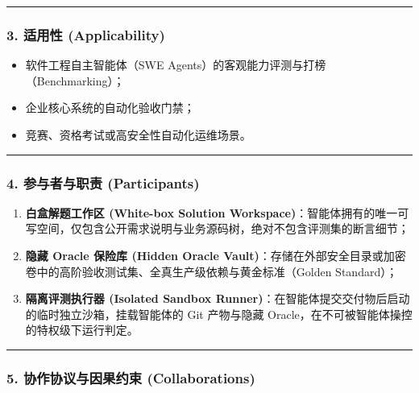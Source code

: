 \begin{center}\rule{0.5\linewidth}{0.5pt}\end{center}

\subsubsection{3. 适用性
(Applicability)}\label{ux9002ux7528ux6027-applicability-17}

\begin{itemize}
\tightlist
\item
  软件工程自主智能体（SWE Agents）的客观能力评测与打榜（Benchmarking）；
\item
  企业核心系统的自动化验收门禁；
\item
  竞赛、资格考试或高安全性自动化运维场景。
\end{itemize}

\begin{center}\rule{0.5\linewidth}{0.5pt}\end{center}

\subsubsection{4. 参与者与职责
(Participants)}\label{ux53c2ux4e0eux8005ux4e0eux804cux8d23-participants-17}

\begin{enumerate}
\def\labelenumi{\arabic{enumi}.}
\tightlist
\item
  \textbf{白盒解题工作区 (White-box Solution
  Workspace)}：智能体拥有的唯一可写空间，仅包含公开需求说明与业务源码树，绝对不包含评测集的断言细节；
\item
  \textbf{隐藏 Oracle 保险库 (Hidden Oracle
  Vault)}：存储在外部安全目录或加密卷中的高阶验收测试集、全真生产级依赖与黄金标准（Golden
  Standard）；
\item
  \textbf{隔离评测执行器 (Isolated Sandbox
  Runner)}：在智能体提交交付物后启动的临时独立沙箱，挂载智能体的 Git
  产物与隐藏 Oracle，在不可被智能体操控的特权级下运行判定。
\end{enumerate}

\begin{center}\rule{0.5\linewidth}{0.5pt}\end{center}

\subsubsection{5. 协作协议与因果约束
(Collaborations)}\label{ux534fux4f5cux534fux8baeux4e0eux56e0ux679cux7ea6ux675f-collaborations-14}

